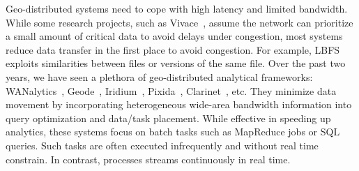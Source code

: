  Geo-distributed systems need to cope with high latency
and limited bandwidth. While some research projects, such as
Vivace~\cite{cho2012surviving}, assume the network can prioritize a small amount
of critical data to avoid delays under congestion, most systems reduce data
transfer in the first place to avoid congestion. For example,
LBFS~\cite{muthitacharoen2001low} exploits similarities between files or
versions of the same file. Over the past two years, we have seen a plethora of
geo-distributed analytical frameworks:
WANalytics~\cite{vulimiri2015wananlytics}, Geode~\cite{vulimiri2015global},
Iridium~\cite{pu2015low}, Pixida~\cite{kloudas2015pixida},
Clarinet~\cite{viswanathan2016clarinet}, etc. They minimize data movement by
incorporating heterogeneous wide-area bandwidth information into query
optimization and data/task placement. While effective in speeding up analytics,
these systems focus on batch tasks such as MapReduce jobs or SQL queries. Such
tasks are often executed infrequently and without real time constrain. In
contrast, \sysname{} processes streams continuously in real time.









